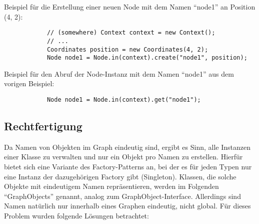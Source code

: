 \documentclass[accentcolor=tud0b,12pt,paper=a4]{tudreport}
\begin{document}
			Beispiel für die Erstellung einer neuen Node mit dem Namen "`node1"' an Position (4, 2):\\
			\begin{lstlisting}
			// (somewhere) Context context = new Context();
			// ...
			Coordinates position = new Coordinates(4, 2);
			Node node1 = Node.in(context).create("node1", position);		
			\end{lstlisting}
			
			Beispiel für den Abruf der Node-Instanz mit dem Namen "`node1"' aus dem vorigen Beispiel:\\
			\begin{lstlisting}
			Node node1 = Node.in(context).get("node1");
			\end{lstlisting}
		
		\subsection{Rechtfertigung}
			Da Namen von Objekten im Graph eindeutig sind, ergibt es Sinn, alle Instanzen einer Klasse zu verwalten und nur ein Objekt pro Namen zu erstellen. Hierfür bietet sich eine Variante des Factory-Patterns an, bei der es für jeden Typen nur eine Instanz der dazugehörigen Factory gibt (Singleton).
			Klassen, die solche Objekte mit eindeutigem Namen repräsentieren, werden im Folgenden "`GraphObjects"' genannt, analog zum GraphObject-Interface.
			Allerdings sind Namen natürlich nur innerhalb eines Graphen eindeutig, nicht global. Für dieses Problem wurden folgende Lösungen betrachtet:
\end{document}

